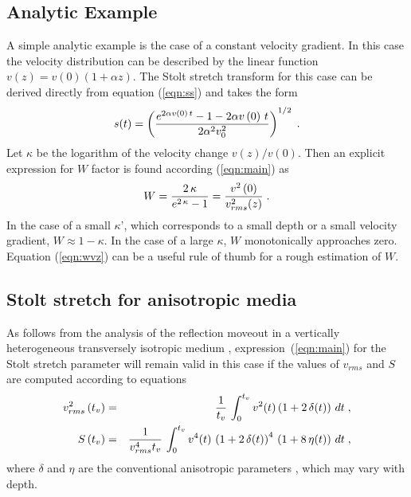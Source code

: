\subsection{Analytic Example}
A simple analytic example is the case of a constant velocity gradient.
In this case the velocity distribution can be described by the linear
function $v\left(z\right)=v\left(0\right)(1+\alpha z)$. The Stolt
stretch transform for this case can be derived directly from equation
(\ref{eqn:ss}) and takes the form
\begin{equation}
s(t)=\left({e^{2 \alpha v\left(0\right)\,t} -1 -
2 \alpha v\left(0\right)\,t} \over 
{2 \alpha^2 v_0^2}\right)^{1/2}\;.
\label{eqn:ssvz} 
\end{equation}
Let $\kappa$ be the logarithm of the velocity change $v(z)/v(0)$. Then
an explicit expression for $W$ factor is found according
(\ref{eqn:main}) as
\begin{equation}
W={{2\,\kappa}\over{e^{2\,\kappa}-1}}={v^2\left(0\right) \over
v_{rms}^2(z)}\;.
\label{eqn:wvz} 
\end{equation}
In the case of a small $\kappa$', which corresponds to a small depth
or a small velocity gradient, $W \approx 1-\kappa$. In the case of a
large $\kappa$, $W$ monotonically approaches zero. Equation
(\ref{eqn:wvz}) can be a useful rule of thumb for a rough estimation
of $W$.

\subsection{Stolt stretch for anisotropic media}

As follows from the analysis of the reflection moveout in a vertically
heterogeneous transversely isotropic medium \cite{Fomel.sep.92.135},
expression~(\ref{eqn:main}) for the Stolt stretch parameter will
remain valid in this case if the values of $v_{rms}$ and $S$ are
computed according to equations
\begin{eqnarray}
v_{rms}^2\left(t_v\right) & = &
{1 \over t_v}\,\int_{0}^{t_v} v^2(t) \left(1 + 2\,\delta(t)\right)\,dt\;,
\label{eqn:TIvrms} \\
S\left(t_v\right) & = & {1 \over{v_{rms}^4 t_v}}\,\int_{0}^{t_v} v^4(t) \,
\left(1 + 2\,\delta(t)\right)^4\,\left(1 + 8\,\eta(t)\right) \,dt\;,
\label{eqn:TIsk}
\end{eqnarray}
where $\delta$ and $\eta$ are the conventional anisotropic parameters
\cite{GEO51-10-19541966,GEO60-05-15501566}, which may vary with depth.

